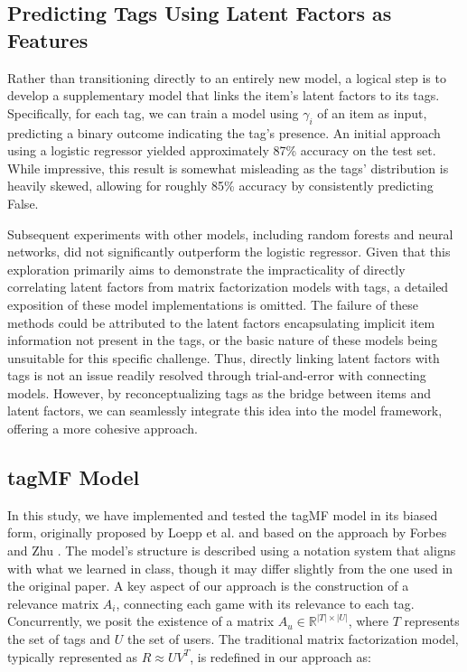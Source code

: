 \documentclass[sigplan,screen]{acmart}
\begin{document}
\subsection{Predicting Tags Using Latent Factors as Features}
Rather than transitioning directly to an entirely new model, a logical step is to develop a supplementary model that links the item's latent factors to its tags. Specifically, for each tag, we can train a model using \(\gamma_i\) of an item as input, predicting a binary outcome indicating the tag's presence. An initial approach using a logistic regressor yielded approximately 87\% accuracy on the test set. While impressive, this result is somewhat misleading as the tags' distribution is heavily skewed, allowing for roughly 85\% accuracy by consistently predicting False.

Subsequent experiments with other models, including random forests and neural networks, did not significantly outperform the logistic regressor. Given that this exploration primarily aims to demonstrate the impracticality of directly correlating latent factors from matrix factorization models with tags, a detailed exposition of these model implementations is omitted. The failure of these methods could be attributed to the latent factors encapsulating implicit item information not present in the tags, or the basic nature of these models being unsuitable for this specific challenge. Thus, directly linking latent factors with tags is not an issue readily resolved through trial-and-error with connecting models. However, by reconceptualizing tags as the bridge between items and latent factors, we can seamlessly integrate this idea into the model framework, offering a more cohesive approach.

\subsection{tagMF Model}

In this study, we have implemented and tested the tagMF model in its biased form, originally proposed by Loepp et al. \cite{LOEPP201921} and based on the approach by Forbes and Zhu \cite{ForbesZhu11}. The model's structure is described using a notation system that aligns with what we learned in class, though it may differ slightly from the one used in the original paper. A key aspect of our approach is the construction of a relevance matrix \(A_i\), connecting each game with its relevance to each tag. Concurrently, we posit the existence of a matrix \(A_u \in \mathbb{R}^{|T| \times |U|}\), where \(T\) represents the set of tags and \(U\) the set of users. The traditional matrix factorization model, typically represented as \(R \approx U V^T\), is redefined in our approach as:
\end{document}
